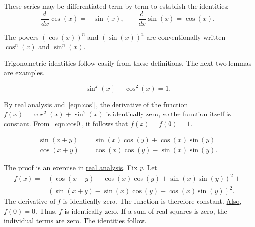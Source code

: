 These series may be differentiated term-by-term to establish the identities:
%
    \begin{equation}\label{eqn:cos'}
    \frac{d\phantom{~}} {dx}\cos(x) = -\sin(x),\qquad \frac{ d\phantom{~} }{dx}\sin(x) = \cos(x).
    \end{equation}

The powers $(\cos(x))^n$ and $(\sin(x))^n$ are conventionally written
$\cos^n(x)$ and $\sin^n(x)$.

Trigonometric identities follow easily from these definitions.  The next two lemmas are examples.
%

\begin{lemma}\label{lemma:circle} 
\begin{displaymath}
  \sin^2(x) + \cos^2(x) = 1.
\end{displaymath}
\end{lemma}
%

\begin{proved}
By \hyperref[back:analysis]{real analysis} and~\eqref{eqn:cos'},
the derivative of the function $f(x) = \cos^2(x) +\sin^2(x)$ is
identically zero, so the function itself is constant.  From~\eqref{eqn:cos0}, it follows that $f(x)=f(0)=1$.
\swallowed\end{proved}


\begin{lemma}\label{lemma:sin-add}
  \begin{displaymath}\begin{array}{lll}
  \sin(x+y) &= \sin(x)\cos(y) + \cos(x)\sin(y)\\
  \cos(x+y)  &= \cos(x)\cos(y) - \sin(x)\sin(y).
  \end{array}\end{displaymath}
\end{lemma}
%

\begin{proved}
The proof is an exercise in \hyperref[back:analysis]{real analysis}.
Fix $y$.  Let
    \begin{displaymath}\begin{array}{lll}
    f(x) = &(\cos(x+y) - \cos(x)\cos(y) +
    \sin(x)\sin(y))^2 +\\ & (\sin(x+y) -\sin(x)\cos(y) -
    \cos(x)\sin(y))^2.
    \end{array}\end{displaymath}
The derivative of $f$ is identically zero.  The function is therefore constant.  \hyperref[eqn:cos0]{Also}, $f(0)=0$.  Thus, $f$ is identically zero.
If a sum of real squares is zero, the individual terms are zero. The
identities follow.
\swallowed\end{proved}

